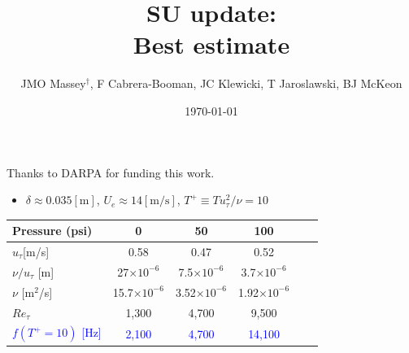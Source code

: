 \documentclass[aspectratio=169,9pt]{beamer}
\title{SU update: \\ Best estimate}
\author{JMO Massey$^{\dag}$, F Cabrera-Booman, JC Klewicki, T Jaroslawski, BJ McKeon}
\institute{Center for Turbulence Research \\ Stanford University}
\date{\today}
\begin{document}
\begin{frame}
    \setcounter{framenumber}{0}
    \titlepage
    \vfill
    {\scriptsize \centering Thanks to DARPA for funding this work.\par}
\end{frame}

\begin{frame}

    \begin{itemize}
        \item $\delta\approx 0.035[\mathrm{m}]$, $U_e \approx14[\mathrm{m/s}]$, $T^+\equiv T u_\tau^2/\nu=10$
    \end{itemize}
    \begin{table}[]
        \centering
        \begin{tabular}{lccccc}
        \toprule
        Pressure (psi) & 0  &  50 & 100 \\
        \midrule
        $u_\tau$[m/s] & 0.58 & 0.47 & 0.52 \\
        $\nu/u_\tau$ [m] & 27$\times 10^{-6}$ & 7.5$\times 10^{-6}$ & 3.7$\times 10^{-6}$ \\
        $\nu$ [m$^2$/s] & 15.7$\times 10^{-6}$ & 3.52$\times 10^{-6}$ & 1.92$\times 10^{-6}$ \\
        $Re_\tau$ & 1,300 & 4,700 & 9,500 \\
        \textcolor{blue}{$f(T^+=10)$ [Hz]} & \textcolor{blue}{2,100} & \textcolor{blue}{4,700} & \textcolor{blue}{14,100} \\
        \bottomrule
        \end{tabular}
    \end{table}

\end{frame}
\end{document}
